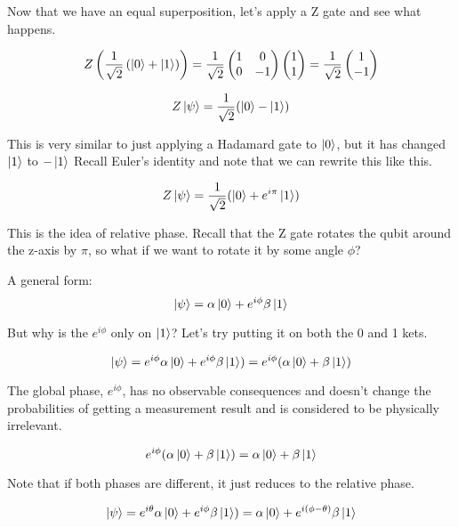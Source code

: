 \documentclass[12pt]{article}
\begin{document}
Now that we have an equal superposition, let's apply a Z gate and see what happens.

$$
Z\left(\frac{1}{\sqrt{2}}\left(\ket{0}+\ket{1}\right)\right)
= \frac{1}{\sqrt{2}} \begin{pmatrix} 1 & 0 \\ 0 & -1 \end{pmatrix} \begin{pmatrix} 1 \\ 1 \end{pmatrix}
= \frac{1}{\sqrt{2}} \begin{pmatrix} 1 \\ -1 \end{pmatrix}
$$


$$
Z\ket{\psi} = \frac{1}{\sqrt{2}}( \ket{0} - \ket{1})
$$

This is very similar to just applying a Hadamard gate to $\ket{0}$, but it has changed $\ket{1}$ to $-\ket{1}$ Recall Euler's identity and note that we can rewrite this like this.

$$
Z\ket{\psi} = \frac{1}{\sqrt{2}}( \ket{0} + e^{i\pi}\ket{1})
$$

This is the idea of relative phase. Recall that the Z gate rotates the qubit around the z-axis by $\pi$, so what if we want to rotate it by some angle $\phi$? 

A general form:
$$
\ket{\psi} = \alpha\ket0 + e^{i\phi}\beta\ket1
$$

But why is the $e^{i\phi}$ only on $\ket{1}$? Let's try putting it on both the 0 and 1 kets.

$$
\ket{\psi} = e^{i\phi} \alpha \ket{0} + e^{i\phi} \beta \ket{1}) = e^{i\phi}(\alpha \ket{0} + \beta \ket{1})
$$

The global phase, $e^{i\phi}$, has no observable consequences and doesn't change the probabilities of getting a measurement result and is considered to be physically irrelevant.\cite{Quantum_Information}

$$e^{i\phi}(\alpha \ket{0} + \beta \ket{1}) = \alpha \ket{0} + \beta \ket{1}$$




Note that if both phases are different, it just reduces to the relative phase.

$$
\ket{\psi} = e^{i\theta} \alpha \ket{0} + e^{i\phi} \beta \ket{1}) = \alpha \ket{0} + e^{i(\phi-\theta)}\beta \ket{1}
$$
\end{document}
